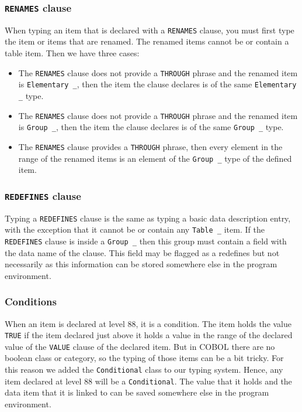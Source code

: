 \documentclass[a4paper,10pt]{article}
\newcommand{\ocamli}[1]{\texttt{#1}}
\newcommand{\coboli}[1]{\texttt{#1}}
\begin{document}
\subsubsection{\coboli{RENAMES} clause}
When typing an item that is declared with a \coboli{RENAMES} clause, you must first type the item
or items that are renamed. The renamed items cannot be or contain a table item. Then we have three
cases:
\begin{itemize}
  \item The \coboli{RENAMES} clause does not provide a \coboli{THROUGH} phrase and the renamed
    item is \ocamli{Elementary _}, then the item the clause declares is of the same \ocamli{Elementary _}
    type.
  \item The \coboli{RENAMES} clause does not provide a \coboli{THROUGH} phrase and the renamed
    item is \ocamli{Group _}, then the item the clause declares is of the same \ocamli{Group _}
    type.
  \item The \coboli{RENAMES} clause provides a \coboli{THROUGH} phrase, then every element in the
    range of the renamed items is an element of the \ocamli{Group _} type of the defined item.
\end{itemize}

\subsubsection{\coboli{REDEFINES} clause}
Typing a \coboli{REDEFINES} clause is the same as typing a basic data description entry, with the
exception that it cannot be or contain any \ocamli{Table _} item. If the \coboli{REDEFINES} clause
is inside a \ocamli{Group _} then this group must contain a field with the data name of the clause.
This field may be flagged as a redefines but not necessarily as this information can be stored somewhere
else in the program environment.

\subsubsection{Conditions}
When an item is declared at level $88$, it is a condition. The item holds the value \coboli{TRUE} if
the item declared just above it holds a value in the range of the declared value of the \coboli{VALUE}
clause of the declared item. But in COBOL there are no boolean class or category, so the typing
of those items can be a bit tricky.
For this reason we added the \ocamli{Conditional} class to our typing system. Hence, any item
declared at level 88 will be a \ocamli{Conditional}. The value that it holds and the data item
that it is linked to can be saved somewhere else in the program environment.
\end{document}
